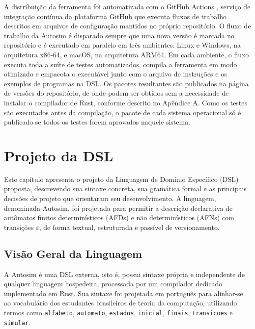 \documentclass[
    12pt
    ,oneside
    ,a4paper
    ,chapter=TITLE
    ,section=TITLE
    ,sumario=abnt-6027-2012]{abntex2}
\begin{document}
A distribuição da ferramenta foi automatizada com o GitHub Actions \cite{githubactions}, serviço
de integração contínua da plataforma GitHub que executa fluxos de trabalho descritos em
arquivos de configuração mantidos no próprio repositório. O fluxo de trabalho da Autosim é
disparado sempre que uma nova versão é marcada no repositório e é executado em paralelo em
três ambientes: Linux e Windows, na arquitetura x86-64, e macOS, na arquitetura ARM64. Em cada
ambiente, o fluxo executa toda a suíte de testes automatizados, compila a ferramenta em modo
otimizado e empacota o executável junto com o arquivo de instruções e os exemplos de
programas na DSL. Os pacotes resultantes são publicados na página de versões do repositório,
de onde podem ser obtidos sem a necessidade de instalar o compilador de Rust, conforme descrito
no Apêndice A. Como os testes são executados antes da compilação, o pacote de cada sistema
operacional só é publicado se todos os testes forem aprovados naquele sistema.

\chapter{Projeto da DSL}
\label{cap:projeto}

Este capítulo apresenta o projeto da Linguagem de Domínio Específico (DSL) proposta,
descrevendo sua sintaxe concreta, sua gramática formal e as principais decisões de projeto
que orientaram seu desenvolvimento. A linguagem, denominada Autosim, foi projetada para
permitir a descrição declarativa de autômatos finitos determinísticos (AFDs) e
não determinísticos (AFNs) com transições $\varepsilon$, de forma textual, estruturada e
passível de versionamento.

\section{Visão Geral da Linguagem}
\label{sec:dsl-visao-geral}

A Autosim é uma DSL externa, isto é, possui sintaxe própria e independente de qualquer
linguagem hospedeira, processada por um compilador dedicado implementado em Rust. Sua
sintaxe foi projetada em português para alinhar-se ao vocabulário dos estudantes
brasileiros de teoria da computação, utilizando termos como \texttt{alfabeto},
\texttt{automato}, \texttt{estados}, \texttt{inicial}, \texttt{finais},
\texttt{transicoes} e \texttt{simular}.
\end{document}
